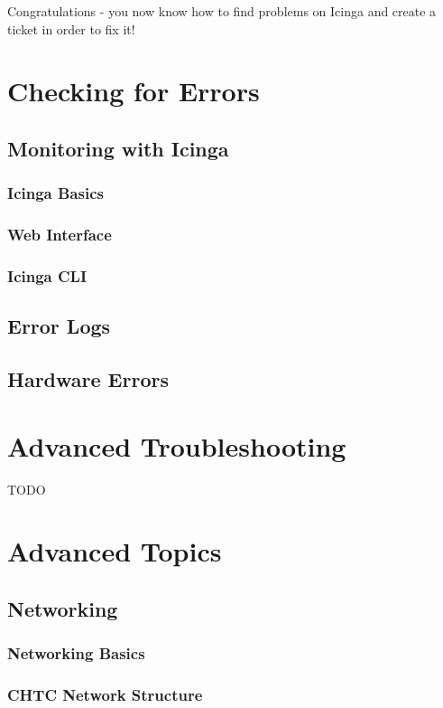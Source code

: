 \documentclass[10pt,letterpaper]{article}
\begin{document}
    Congratulations - you now know how to find problems on Icinga and create a ticket
    in order to fix it!
\clearpage

\section{Checking for Errors}
    \subsection{Monitoring with Icinga}
        \subsubsection{Icinga Basics}
        \subsubsection{Web Interface}
        \subsubsection{Icinga CLI}
    \subsection{Error Logs}
    \subsection{Hardware Errors}
\clearpage

\section{Advanced Troubleshooting}
    TODO
\clearpage

\section{Advanced Topics}
    \subsection{Networking}
        \subsubsection{Networking Basics}
        \subsubsection{CHTC Network Structure}
\end{document}
